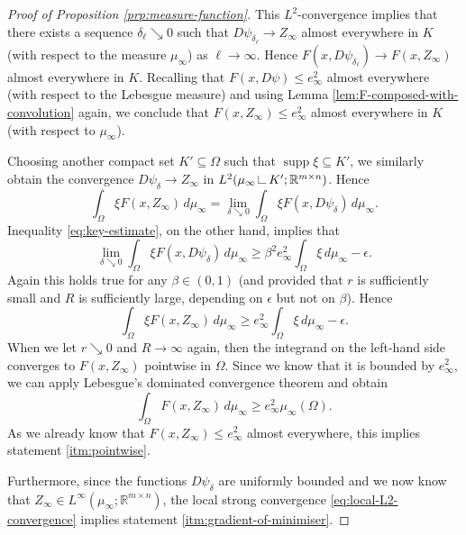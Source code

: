 \documentclass[a4paper]{article}
\newcommand{\R}{\mathbb{R}}
\DeclareMathOperator{\supp}{supp}
\newcommand{\restr}{\mathchoice
{\kern2pt\mbox{\vrule width 0.08ex height1.5ex depth0ex\kern-0.08ex\vrule width 1.5ex height.08ex depth0ex}\kern2pt}
{\kern2pt\mbox{\vrule width 0.08ex height1.5ex depth0ex\kern-0.08ex\vrule width 1.5ex height.08ex depth0ex}\kern2pt}
{\kern1.5pt\mbox{\vrule width 0.06ex height1.1ex depth0ex\kern-0.06ex\vrule width 1.1ex height.06ex depth0ex}\kern1.5pt}
{\kern1pt\mbox{\vrule width 0.04ex height0.75ex depth0ex\kern-0.04ex\vrule width 0.75ex height.04ex depth0ex}\kern1pt}
}
\theoremstyle{definition}
\theoremstyle{remark}
\begin{document}
\begin{proof}[Proof of Proposition \ref{prp:measure-function}]
This $L^2$-convergence implies that there exists a sequence
$\delta_\ell \searrow 0$ such that $D\psi_{\delta_\ell} \to Z_\infty$
almost everywhere in $K$ (with respect to the measure $\mu_\infty$)
as $\ell \to \infty$. Hence
$F(x, D\psi_{\delta_\ell}) \to F(x, Z_\infty)$ almost everywhere in $K$.
Recalling that $F(x, D\psi) \le e_\infty^2$ almost everywhere (with respect
to the Lebesgue measure) and using Lemma \ref{lem:F-composed-with-convolution} again, we conclude that
$F(x, Z_\infty) \le e_\infty^2$ almost everywhere in $K$ (with respect to $\mu_\infty$).

Choosing another compact set $K' \subseteq \Omega$ such that
$\supp \xi \subseteq K'$, we similarly obtain the convergence
$D\psi_\delta \to Z_\infty$ in $L^2(\mu_\infty \restr K'; \R^{m \times n})$.
Hence
\[
\int_\Omega \xi F(x, Z_\infty) \, d\mu_\infty = \lim_{\delta \searrow 0} \int_\Omega \xi F(x, D\psi_\delta) \, d\mu_\infty.
\]
Inequality \eqref{eq:key-estimate}, on the other hand, implies that
\[
\lim_{\delta \searrow 0} \int_\Omega \xi F(x, D\psi_\delta) \, d\mu_\infty \ge \beta^2 e_\infty^2 \int_\Omega \xi \, d\mu_\infty - \epsilon.
\]
Again this holds true for any $\beta \in (0, 1)$ (and provided that $r$ is sufficiently small and $R$ is sufficiently large,
depending on $\epsilon$ but not on $\beta$). Hence
\[
\int_\Omega \xi F(x, Z_\infty) \, d\mu_\infty \ge e_\infty^2 \int_\Omega \xi \, d\mu_\infty - \epsilon.
\]
When we let $r \searrow 0$ and $R \to \infty$ again, then the integrand on the left-hand side converges to $F(x, Z_\infty)$
pointwise in $\Omega$. Since we know that it is bounded by $e_\infty^2$, we can apply Lebesgue's dominated
convergence theorem and obtain
\[
\int_\Omega F(x, Z_\infty) \, d\mu_\infty \ge e_\infty^2 \mu_\infty(\Omega).
\]
As we already know that $F(x, Z_\infty) \le e_\infty^2$ almost everywhere,
this implies statement \ref{itm:pointwise}.

Furthermore, since the functions $D\psi_\delta$ are uniformly bounded
and we now know that $Z_\infty \in L^\infty(\mu_\infty; \R^{m \times n})$,
the local strong convergence \eqref{eq:local-L2-convergence} implies
statement \ref{itm:gradient-of-minimiser}.


\end{proof}
\end{document}
